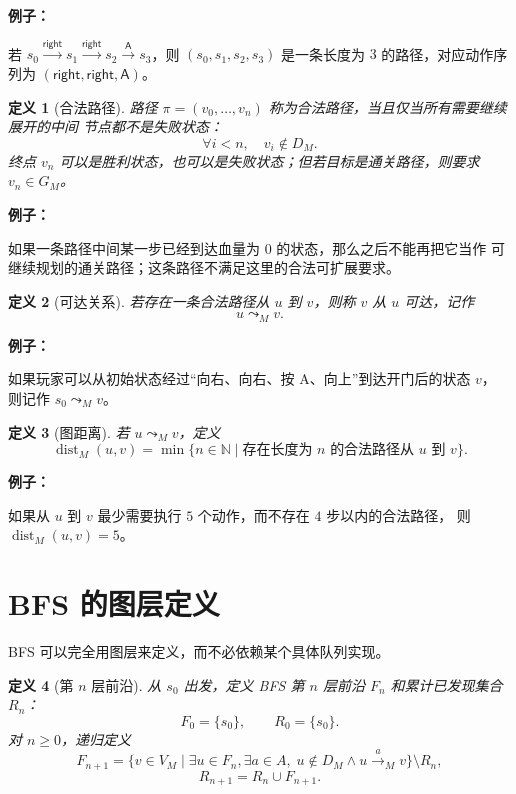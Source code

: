\documentclass[UTF8]{ctexart}
\theoremstyle{nesylinkblock}
\newtheorem{definition}{定义}
\DeclareMathOperator{\dist}{dist}
\newenvironment{examplebox}
  {\begin{center}\begin{lrbox}{\exampleboxcontent}\begin{minipage}{0.92\linewidth}
   \textbf{例子：}\par\smallskip}
  {\end{minipage}\end{lrbox}\fbox{\usebox{\exampleboxcontent}}\end{center}}
\begin{document}
\begin{examplebox}
若 $s_0\xrightarrow{\mathsf{right}}s_1\xrightarrow{\mathsf{right}}s_2
\xrightarrow{\mathsf{A}}s_3$，则
$(s_0,s_1,s_2,s_3)$ 是一条长度为 $3$ 的路径，对应动作序列为
$(\mathsf{right},\mathsf{right},\mathsf{A})$。
\end{examplebox}

\begin{definition}[合法路径]
路径 $\pi=(v_0,\ldots,v_n)$ 称为合法路径，当且仅当所有需要继续展开的中间
节点都不是失败状态：
\[
  \forall i<n,\quad v_i\notin D_M.
\]
终点 $v_n$ 可以是胜利状态，也可以是失败状态；但若目标是通关路径，则要求
$v_n\in G_M$。
\end{definition}

\begin{examplebox}
如果一条路径中间某一步已经到达血量为 $0$ 的状态，那么之后不能再把它当作
可继续规划的通关路径；这条路径不满足这里的合法可扩展要求。
\end{examplebox}

\begin{definition}[可达关系]
若存在一条合法路径从 $u$ 到 $v$，则称 $v$ 从 $u$ 可达，记作
\[
  u\leadsto_M v.
\]
\end{definition}

\begin{examplebox}
如果玩家可以从初始状态经过“向右、向右、按 A、向上”到达开门后的状态 $v$，
则记作 $s_0\leadsto_M v$。
\end{examplebox}

\begin{definition}[图距离]
若 $u\leadsto_M v$，定义
\[
  \dist_M(u,v)
  =
  \min\{n\in\mathbb{N}\mid
  \text{存在长度为 }n\text{ 的合法路径从 }u\text{ 到 }v\}.
\]
\end{definition}

\begin{examplebox}
如果从 $u$ 到 $v$ 最少需要执行 $5$ 个动作，而不存在 $4$ 步以内的合法路径，
则 $\dist_M(u,v)=5$。
\end{examplebox}

\section{BFS 的图层定义}

BFS 可以完全用图层来定义，而不必依赖某个具体队列实现。

\begin{definition}[第 $n$ 层前沿]
从 $s_0$ 出发，定义 BFS 第 $n$ 层前沿 $F_n$ 和累计已发现集合 $R_n$：
\[
  F_0=\{s_0\},
  \qquad
  R_0=\{s_0\}.
\]
对 $n\ge0$，递归定义
\[
  F_{n+1}
  =
  \{v\in V_M\mid
    \exists u\in F_n,\exists a\in A,\;
    u\notin D_M\land u\xrightarrow{a}_M v
  \}
  \setminus R_n,
\]
\[
  R_{n+1}=R_n\cup F_{n+1}.
\]
\end{definition}
\end{document}
